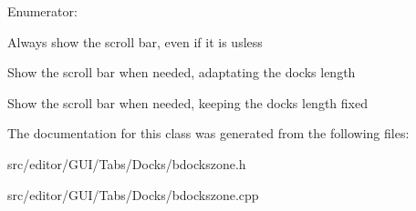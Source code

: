 \begin{Desc}
\item[\-Enumerator\-: ]\par
\begin{description}
\item[{\em 
\hypertarget{class_b_docks_zone_aaa04c632b39dce77b61a3a28b7418fdda56cc1afb42c3bd98e3e64599883383a5}{\-Always\-Visible}\label{class_b_docks_zone_aaa04c632b39dce77b61a3a28b7418fdda56cc1afb42c3bd98e3e64599883383a5}
}]\-Always show the scroll bar, even if it is usless \item[{\em 
\hypertarget{class_b_docks_zone_aaa04c632b39dce77b61a3a28b7418fddabef53da1c509bfc9156ed6d8d8617972}{\-Adaptative}\label{class_b_docks_zone_aaa04c632b39dce77b61a3a28b7418fddabef53da1c509bfc9156ed6d8d8617972}
}]\-Show the scroll bar when needed, adaptating the docks length \item[{\em 
\hypertarget{class_b_docks_zone_aaa04c632b39dce77b61a3a28b7418fddae1dd9bb823904efc8224bffef1fe6f22}{\-Fixed}\label{class_b_docks_zone_aaa04c632b39dce77b61a3a28b7418fddae1dd9bb823904efc8224bffef1fe6f22}
}]\-Show the scroll bar when needed, keeping the docks length fixed \end{description}
\end{Desc}



\-The documentation for this class was generated from the following files\-:\begin{DoxyCompactItemize}
\item 
src/editor/\-G\-U\-I/\-Tabs/\-Docks/bdockszone.\-h\item 
src/editor/\-G\-U\-I/\-Tabs/\-Docks/bdockszone.\-cpp\end{DoxyCompactItemize}

